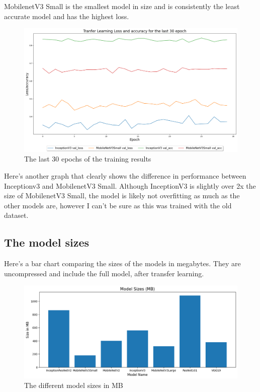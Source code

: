 \documentclass[]{final_report}
\begin{document}
MobilenetV3 Small is the smallest model in size and is consistently the least accurate model and has the highest loss.

\begin{figure}[ht!]
  \centering
  \includegraphics[width=120mm]{images/mobilenet-v3-small-vs-inception-v3.png}
  \caption{The last 30 epochs of the training results}
\end{figure}

Here's another graph that clearly shows the difference in performance between Inceptionv3 and MobilenetV3 Small.
Although InceptionV3 is slightly over 2x the size of MobilenetV3 Small, the model is likely not overfitting as much as the other models are, however I can't be sure as this was trained with the old dataset.

\pagebreak
\subsection{The model sizes}

Here's a bar chart comparing the sizes of the models in megabytes.
They are uncompressed and include the full model, after transfer learning.

\begin{figure}[ht!]
  \centering
  \includegraphics[width=120mm]{images/model-sizes.png}
  \caption{The different model sizes in MB}
\end{figure}
\end{document}
